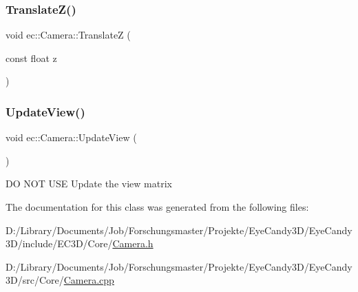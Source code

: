 \subsubsection{\texorpdfstring{Translate\+Z()}{TranslateZ()}}
{\footnotesize\ttfamily void ec\+::\+Camera\+::\+TranslateZ (\begin{DoxyParamCaption}\item[{const float}]{z }\end{DoxyParamCaption})}

\mbox{\label{classec_1_1_camera_aa358a0b0f9878f3ea39cfb5bccd9ddb9}} 
\subsubsection{\texorpdfstring{Update\+View()}{UpdateView()}}
{\footnotesize\ttfamily void ec\+::\+Camera\+::\+Update\+View (\begin{DoxyParamCaption}{ }\end{DoxyParamCaption})}

DO N\+OT U\+SE Update the view matrix 

The documentation for this class was generated from the following files\+:\begin{DoxyCompactItemize}
\item 
D\+:/\+Library/\+Documents/\+Job/\+Forschungsmaster/\+Projekte/\+Eye\+Candy3\+D/\+Eye\+Candy3\+D/include/\+E\+C3\+D/\+Core/\mbox{\hyperlink{_camera_8h}{Camera.\+h}}\item 
D\+:/\+Library/\+Documents/\+Job/\+Forschungsmaster/\+Projekte/\+Eye\+Candy3\+D/\+Eye\+Candy3\+D/src/\+Core/\mbox{\hyperlink{_camera_8cpp}{Camera.\+cpp}}\end{DoxyCompactItemize}
